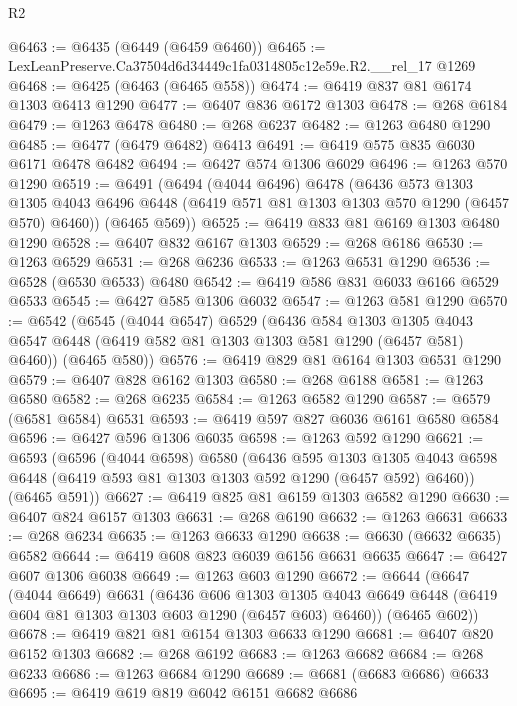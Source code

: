 \begin{lexlean}{R2}
\begin{coremodule}
@6463 := @6435 (@6449 (@6459 @6460))
@6465 := LexLeanPreserve.Ca37504d6d34449c1fa0314805c12e59e.R2.__rel_17 @1269
@6468 := @6425 (@6463 (@6465 @558))
@6474 := @6419 @837 @81 @6174 @1303 @6413 @1290
@6477 := @6407 @836 @6172 @1303
@6478 := @268 @6184
@6479 := @1263 @6478
@6480 := @268 @6237
@6482 := @1263 @6480 @1290
@6485 := @6477 (@6479 @6482) @6413
@6491 := @6419 @575 @835 @6030 @6171 @6478 @6482
@6494 := @6427 @574 @1306 @6029
@6496 := @1263 @570 @1290
@6519 := @6491
    (@6494
      (@4044 @6496)
      @6478
      (@6436
        @573
        @1303
        @1305
        @4043
        @6496
        @6448
        (@6419 @571 @81 @1303 @1303 @570 @1290 (@6457 @570) @6460))
      (@6465 @569))
@6525 := @6419 @833 @81 @6169 @1303 @6480 @1290
@6528 := @6407 @832 @6167 @1303
@6529 := @268 @6186
@6530 := @1263 @6529
@6531 := @268 @6236
@6533 := @1263 @6531 @1290
@6536 := @6528 (@6530 @6533) @6480
@6542 := @6419 @586 @831 @6033 @6166 @6529 @6533
@6545 := @6427 @585 @1306 @6032
@6547 := @1263 @581 @1290
@6570 := @6542
    (@6545
      (@4044 @6547)
      @6529
      (@6436
        @584
        @1303
        @1305
        @4043
        @6547
        @6448
        (@6419 @582 @81 @1303 @1303 @581 @1290 (@6457 @581) @6460))
      (@6465 @580))
@6576 := @6419 @829 @81 @6164 @1303 @6531 @1290
@6579 := @6407 @828 @6162 @1303
@6580 := @268 @6188
@6581 := @1263 @6580
@6582 := @268 @6235
@6584 := @1263 @6582 @1290
@6587 := @6579 (@6581 @6584) @6531
@6593 := @6419 @597 @827 @6036 @6161 @6580 @6584
@6596 := @6427 @596 @1306 @6035
@6598 := @1263 @592 @1290
@6621 := @6593
    (@6596
      (@4044 @6598)
      @6580
      (@6436
        @595
        @1303
        @1305
        @4043
        @6598
        @6448
        (@6419 @593 @81 @1303 @1303 @592 @1290 (@6457 @592) @6460))
      (@6465 @591))
@6627 := @6419 @825 @81 @6159 @1303 @6582 @1290
@6630 := @6407 @824 @6157 @1303
@6631 := @268 @6190
@6632 := @1263 @6631
@6633 := @268 @6234
@6635 := @1263 @6633 @1290
@6638 := @6630 (@6632 @6635) @6582
@6644 := @6419 @608 @823 @6039 @6156 @6631 @6635
@6647 := @6427 @607 @1306 @6038
@6649 := @1263 @603 @1290
@6672 := @6644
    (@6647
      (@4044 @6649)
      @6631
      (@6436
        @606
        @1303
        @1305
        @4043
        @6649
        @6448
        (@6419 @604 @81 @1303 @1303 @603 @1290 (@6457 @603) @6460))
      (@6465 @602))
@6678 := @6419 @821 @81 @6154 @1303 @6633 @1290
@6681 := @6407 @820 @6152 @1303
@6682 := @268 @6192
@6683 := @1263 @6682
@6684 := @268 @6233
@6686 := @1263 @6684 @1290
@6689 := @6681 (@6683 @6686) @6633
@6695 := @6419 @619 @819 @6042 @6151 @6682 @6686

\end{coremodule}
\end{lexlean}
